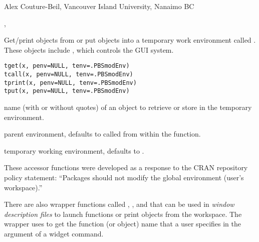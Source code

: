 \documentclass[letterpaper]{book}
\begin{document}
%
\begin{Author}\relax
Alex Couture-Beil, Vancouver Island University, Nanaimo BC
\end{Author}
%
\begin{SeeAlso}\relax
{}, 
\end{SeeAlso}
%
\begin{Description}\relax
Get/print objects from or put objects into a temporary work environment
called . These objects include ,
which controls the GUI system.
\end{Description}
%
\begin{Usage}
\begin{verbatim}
tget(x, penv=NULL, tenv=.PBSmodEnv)
tcall(x, penv=NULL, tenv=.PBSmodEnv)
tprint(x, penv=NULL, tenv=.PBSmodEnv)
tput(x, penv=NULL, tenv=.PBSmodEnv)
\end{verbatim}
\end{Usage}
%
\begin{Arguments}
\begin{ldescription}
\item[\code{x}] name (with or without quotes) of an object to retrieve or store in the temporary environment.
\item[\code{penv}] parent environment, defaults to  called from within the function.
\item[\code{tenv}] temporary working environment, defaults to .
\end{ldescription}
\end{Arguments}
%
\begin{Details}\relax
These accessor functions were developed as a response to the CRAN
repository policy statement: ``Packages should not modify the
global environment (user's workspace).''

There are also wrapper functions called , 
, and  that can be used in 
\emph{window description files} to launch functions or print objects
from the  workspace. 
The wrapper uses  to get the function (or object) 
name that a user specifies in the  argument of a 
widget command.
\end{Details}
\end{document}
